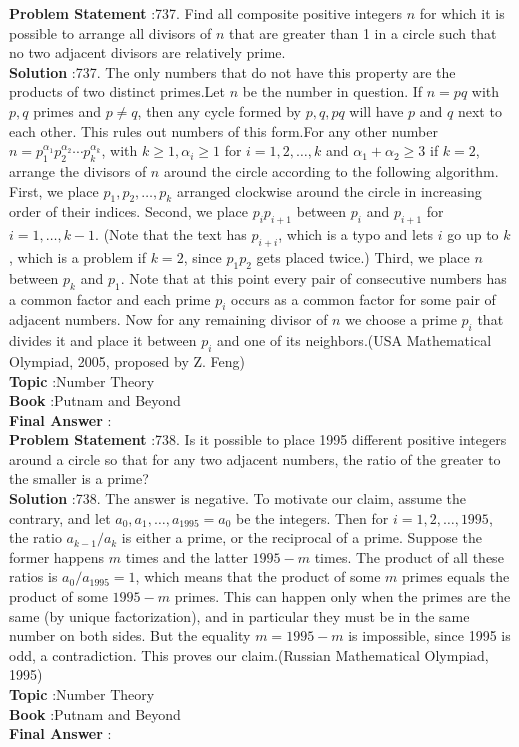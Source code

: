 \documentclass[10pt]{article}
\begin{document}
\textbf{Problem Statement} :737. Find all composite positive integers $n$ for which it is possible to arrange all divisors of $n$ that are greater than 1 in a circle such that no two adjacent divisors are relatively prime.\\
\textbf{Solution} :737. The only numbers that do not have this property are the products of two distinct primes.Let $n$ be the number in question. If $n=p q$ with $p, q$ primes and $p \neq q$, then any cycle formed by $p, q, p q$ will have $p$ and $q$ next to each other. This rules out numbers of this form.For any other number $n=p_{1}^{\alpha_{1}} p_{2}^{\alpha_{2}} \cdots p_{k}^{\alpha_{k}}$, with $k \geq 1, \alpha_{i} \geq 1$ for $i=1,2, \ldots, k$ and $\alpha_{1}+\alpha_{2} \geq 3$ if $k=2$, arrange the divisors of $n$ around the circle according to the following algorithm. First, we place $p_{1}, p_{2}, \ldots, p_{k}$ arranged clockwise around the circle in increasing order of their indices. Second, we place $p_{i} p_{i+1}$ between $p_{i}$ and $p_{i+1}$ for $i=1, \ldots, k-1$. (Note that the text has $p_{i+i}$, which is a typo and lets $i$ go up to $k$, which is a problem if $k=2$, since $p_{1} p_{2}$ gets placed twice.) Third, we place $n$ between $p_{k}$ and $p_{1}$. Note that at this point every pair of consecutive numbers has a common factor and each prime $p_{i}$ occurs as a common factor for some pair of adjacent numbers. Now for any remaining divisor of $n$ we choose a prime $p_{i}$ that divides it and place it between $p_{i}$ and one of its neighbors.(USA Mathematical Olympiad, 2005, proposed by Z. Feng) \\
\textbf{Topic} :Number Theory\\
\textbf{Book} :Putnam and Beyond\\
\textbf{Final Answer} :\\


\textbf{Problem Statement} :738. Is it possible to place 1995 different positive integers around a circle so that for any two adjacent numbers, the ratio of the greater to the smaller is a prime?\\
\textbf{Solution} :738. The answer is negative. To motivate our claim, assume the contrary, and let $a_{0}, a_{1}, \ldots, a_{1995}=a_{0}$ be the integers. Then for $i=1,2, \ldots, 1995$, the ratio $a_{k-1} / a_{k}$ is either a prime, or the reciprocal of a prime. Suppose the former happens $m$ times and the latter $1995-m$ times. The product of all these ratios is $a_{0} / a_{1995}=1$, which means that the product of some $m$ primes equals the product of some $1995-m$ primes. This can happen only when the primes are the same (by unique factorization), and in particular they must be in the same number on both sides. But the equality $m=1995-m$ is impossible, since 1995 is odd, a contradiction. This proves our claim.(Russian Mathematical Olympiad, 1995)\\
\textbf{Topic} :Number Theory\\
\textbf{Book} :Putnam and Beyond\\
\textbf{Final Answer} :\\
\end{document}
